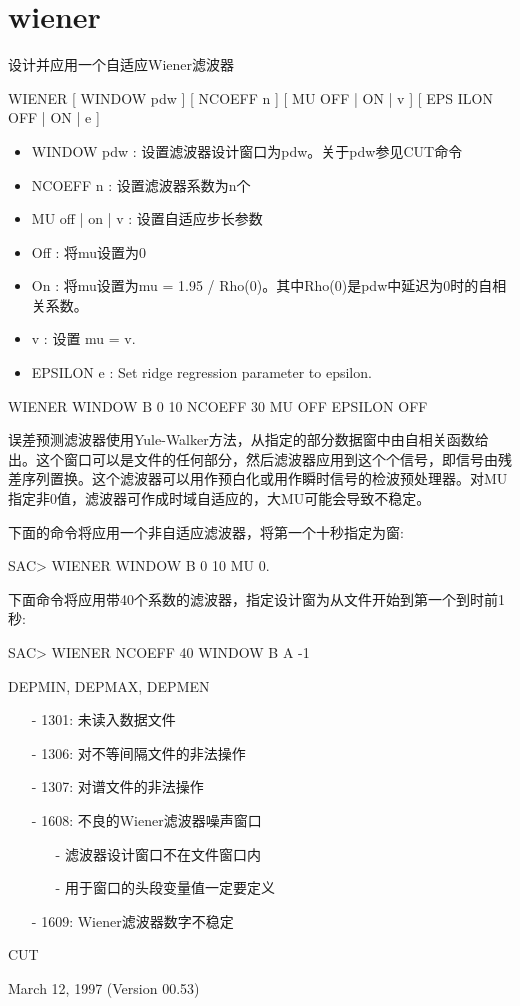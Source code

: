\section{wiener}
\label{cmd:wiener}

设计并应用一个自适应Wiener滤波器

WIENER [ WINDOW pdw ] [ NCOEFF n ] [ MU OFF | ON | v ] [ EPS ILON OFF | ON | e ]

\begin{itemize}
\item WINDOW pdw : 设置滤波器设计窗口为pdw。关于pdw参见CUT命令 
\item NCOEFF n : 设置滤波器系数为n个 
\item MU off | on | v : 设置自适应步长参数 
\item Off : 将mu设置为0 
\item On : 将mu设置为mu = 1.95 / Rho(0)。其中Rho(0)是pdw中延迟为0时的自相关系数。 
\item v : 设置 mu = v. 
\item EPSILON e :  Set ridge regression parameter to epsilon. 
\end{itemize}

WIENER WINDOW B 0 10 NCOEFF 30 MU OFF EPSILON OFF

误差预测滤波器使用Yule-Walker方法，从指定的部分数据窗中由自相关函数给出。这个窗口可以是文件的任何部分，然后滤波器应用到这个个信号，即信号由残差序列置换。这个滤波器可以用作预白化或用作瞬时信号的检波预处理器。对MU指定非0值，滤波器可作成时域自适应的，大MU可能会导致不稳定。

下面的命令将应用一个非自适应滤波器，将第一个十秒指定为窗:
\begin{SACCode}
SAC> WIENER WINDOW B 0 10 MU 0.
\end{SACCode}

下面命令将应用带40个系数的滤波器，指定设计窗为从文件开始到第一个到时前1秒:
\begin{SACCode}
SAC> WIENER NCOEFF 40 WINDOW B A -1
\end{SACCode}

DEPMIN, DEPMAX, DEPMEN

\begin{itemize}
\item[-]1301: 未读入数据文件
\item[-]1306: 对不等间隔文件的非法操作
\item[-]1307: 对谱文件的非法操作
\item[-]1608: 不良的Wiener滤波器噪声窗口
	\begin{itemize}
	\item[-]滤波器设计窗口不在文件窗口内
	\item[-]用于窗口的头段变量值一定要定义
	\end{itemize}
\end{itemize}

\begin{itemize}
\item[-]1609: Wiener滤波器数字不稳定
\end{itemize}

CUT

March 12, 1997 (Version 00.53)

